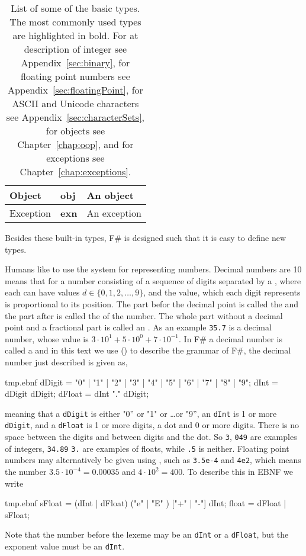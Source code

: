 \begin{table}
\begin{tabularx}{\textwidth}{|l|l|>{\raggedright\arraybackslash}X|}
    \hline
    Object &\textbf{obj} & An object\\
    \hline
    Exception &\textbf{exn} & An exception\\
    \hline
  \end{tabularx}
  \caption{List of some of the basic types. The most commonly used types are highlighted in bold. For at description of integer see Appendix~\ref{sec:binary}, for floating point numbers see Appendix~\ref{sec:floatingPoint}, for ASCII and Unicode characters see Appendix~\ref{sec:characterSets}, for objects see Chapter~\ref{chap:oop}, and for exceptions see Chapter~\ref{chap:exceptions}.}
  \label{tab:primitiveTypes}
\end{table}
Besides these built-in types, F\# is designed such that it is easy to define new types. 

Humans like to use the  system for representing numbers. Decimal numbers are  10 means that for a number consisting of a sequence of digits separated by a , where each  can have values $d \in \{0,1,2,\ldots,9\}$, and the value, which each digit represents is proportional to its position. The part befor the decimal point is called the  and the part after is called the  of the number. The whole part without a decimal point and a fractional part is called an . As an example \lstinline!35.7! is a decimal number, whose value is $3\cdot 10^1+5\cdot 10^0+7\cdot 10^{-1}$. In F\# a decimal number is called a  and in this text we use  () to describe the grammar of F\#, the decimal number just described is given as,
%
\begin{verbatimwrite}{tmp.ebnf}
dDigit = "0" | "1" | "2" | "3" | "4" | "5" | "6" | "7" | "8" | "9";
dInt = dDigit {dDigit};
dFloat = dInt "." {dDigit};
\end{verbatimwrite}
%
meaning that a \lstinline[language=ebnf]!dDigit! is either "0'' or "1" or \dots or "9'', an \lstinline[language=ebnf]!dInt! is 1 or more \lstinline[language=ebnf]!dDigit!, and a \lstinline[language=ebnf]!dFloat! is 1 or more digits, a dot and 0 or more digits. There is no space between the digits and between digits and the dot. So \lstinline!3!, \lstinline!049! are examples of integers, \lstinline!34.89! \lstinline!3.! are examples of floats, while \lstinline!.5! is neither.  Floating point numbers may alternatively be given using , such as \lstinline!3.5e-4! and \lstinline!4e2!, which means the number $3.5\cdot 10^{-4} = 0.00035$ and $4\cdot 10^2=400$. To describe this in EBNF we write
%
\begin{verbatimwrite}{tmp.ebnf}
sFloat = (dInt | dFloat) ("e" | "E" ) ["+" | "-"] dInt;
float = dFloat | sFloat;
\end{verbatimwrite}
%
Note that the number before the lexeme  may be an \lstinline[language=ebnf]!dInt! or a \lstinline[language=ebnf]!dFloat!, but the exponent value must be an \lstinline[language=ebnf]!dInt!.

